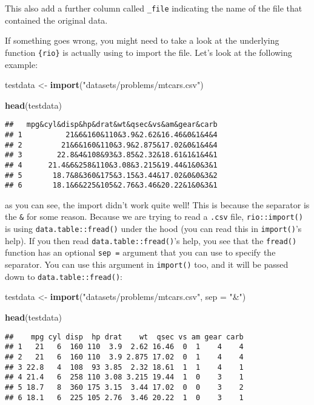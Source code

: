 \documentclass[
]{article}
\newenvironment{Shaded}{\begin{snugshade}}{\end{snugshade}}
\newcommand{\DataTypeTok}[1]{\textcolor[rgb]{0.13,0.29,0.53}{#1}}
\newcommand{\KeywordTok}[1]{\textcolor[rgb]{0.13,0.29,0.53}{\textbf{#1}}}
\newcommand{\NormalTok}[1]{#1}
\newcommand{\StringTok}[1]{\textcolor[rgb]{0.31,0.60,0.02}{#1}}
\begin{document}
This also add a further column called \texttt{\_file} indicating the name of the file that contained the
original data.

If something goes wrong, you might need to take a look at the underlying function \texttt{\{rio\}} is
actually using to import the file. Let's look at the following example:

\begin{Shaded}
\begin{Highlighting}[]
\NormalTok{testdata \textless{}{-}}\StringTok{ }\KeywordTok{import}\NormalTok{(}\StringTok{"datasets/problems/mtcars.csv"}\NormalTok{)}

\KeywordTok{head}\NormalTok{(testdata)}
\end{Highlighting}
\end{Shaded}

\begin{verbatim}
##   mpg&cyl&disp&hp&drat&wt&qsec&vs&am&gear&carb
## 1          21&6&160&110&3.9&2.62&16.46&0&1&4&4
## 2         21&6&160&110&3.9&2.875&17.02&0&1&4&4
## 3        22.8&4&108&93&3.85&2.32&18.61&1&1&4&1
## 4      21.4&6&258&110&3.08&3.215&19.44&1&0&3&1
## 5       18.7&8&360&175&3.15&3.44&17.02&0&0&3&2
## 6       18.1&6&225&105&2.76&3.46&20.22&1&0&3&1
\end{verbatim}

as you can see, the import didn't work quite well! This is because the separator is the \texttt{\&} for
some reason. Because we are trying to read a \texttt{.csv} file, \texttt{rio::import()} is using
\texttt{data.table::fread()} under the hood (you can read this in \texttt{import()}'s help). If you then read
\texttt{data.table::fread()}'s help, you see that the \texttt{fread()} function has an optional \texttt{sep\ =} argument
that you can use to specify the separator. You can use this argument in \texttt{import()} too, and it will
be passed down to \texttt{data.table::fread()}:

\begin{Shaded}
\begin{Highlighting}[]
\NormalTok{testdata \textless{}{-}}\StringTok{ }\KeywordTok{import}\NormalTok{(}\StringTok{"datasets/problems/mtcars.csv"}\NormalTok{, }\DataTypeTok{sep =} \StringTok{"\&"}\NormalTok{)}

\KeywordTok{head}\NormalTok{(testdata)}
\end{Highlighting}
\end{Shaded}

\begin{verbatim}
##    mpg cyl disp  hp drat    wt  qsec vs am gear carb
## 1   21   6  160 110  3.9  2.62 16.46  0  1    4    4
## 2   21   6  160 110  3.9 2.875 17.02  0  1    4    4
## 3 22.8   4  108  93 3.85  2.32 18.61  1  1    4    1
## 4 21.4   6  258 110 3.08 3.215 19.44  1  0    3    1
## 5 18.7   8  360 175 3.15  3.44 17.02  0  0    3    2
## 6 18.1   6  225 105 2.76  3.46 20.22  1  0    3    1
\end{verbatim}
\end{document}
